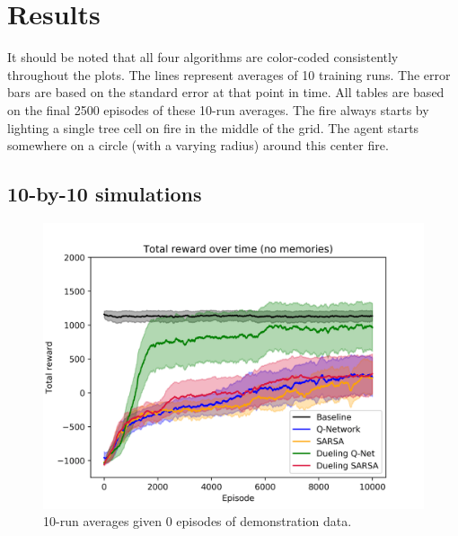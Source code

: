 
\section{Results}
It should be noted that all four algorithms are color-coded consistently throughout the plots. The lines represent averages of 10 training runs. The error bars are based on the standard error at that point in time. All tables are based on the final 2500 episodes of these 10-run averages.
The fire always starts by lighting a single tree cell on fire in the middle of the grid. The agent starts somewhere on a circle (with a varying radius) around this center fire.
\subsection{10-by-10 simulations}
\begin{figure}[H]
    \centering
    \includegraphics[width=\linewidth]{img/results/10-sized/total_rewards_0m-min.png}
    \caption{10-run averages given 0 episodes of demonstration data.}
    \label{fig:10sized-0mem}
\end{figure}
